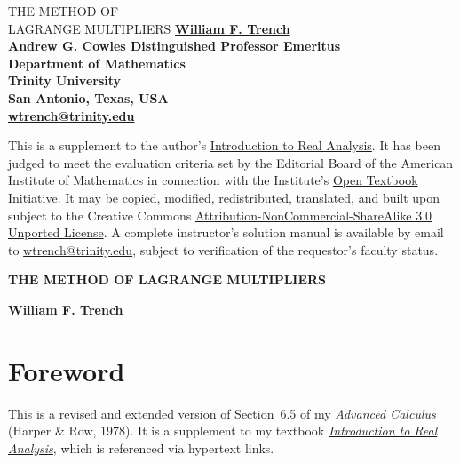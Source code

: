 \documentclass{article}
\begin{document}
\noindent

\thispagestyle{empty}
\bf
\begin{center}
{\Huge THE METHOD OF\\\vspace{.2in} LAGRANGE MULTIPLIERS}
\vspace{.5in}
\huge
\bigskip
\vspace{.75in}
\bf\huge
\href{http://ramanujan.math.trinity.edu/wtrench/index.shtml}
{William F. Trench}
\medskip
\\\large
Andrew G. Cowles Distinguished Professor Emeritus\\
Department of Mathematics\\
Trinity University \\
San Antonio, Texas, USA\\
\href{mailto:{wtrench@trinity.edu}}
{wtrench@trinity.edu}
\large
\vspace*{.75in}
\end{center}


\rm
\noindent

\noindent
This is a supplement to the author's
\href{http://ramanujan.math.trinity.edu/wtrench/texts/TRENCH_REAL_ANALYSIS.PDF}
{\large Introduction to Real Analysis}.
It   has been judged to meet the evaluation criteria set by the
Editorial  Board
of the American Institute of Mathematics in connection with the Institute's
\href{http://www.aimath.org/textbooks/}
{Open
Textbook Initiative}.
It may be copied, modified, redistributed, translated,  and
built upon  subject to the Creative
Commons
      \href{http://creativecommons.org/licenses/by-nc-sa/3.0/deed.en_G}
{Attribution-NonCommercial-ShareAlike 3.0 Unported License}.
A complete instructor's solution manual is available by email to
\href{mailto:wtrench@trinity.edu}
{wtrench@trinity.edu},
 subject to verification of the requestor's
faculty status.

\newpage

\centerline{\bf THE METHOD OF LAGRANGE MULTIPLIERS}
\medskip
\medskip

\centerline{\bf William F. Trench}
\medskip

\section{Foreword} \label{section:1}
This is a revised and extended version of Section~6.5 of my
\emph{Advanced Calculus}
(Harper \& Row, 1978).
It is a supplement to my textbook
\href{http://ramanujan.math.trinity.edu/wtrench/texts/TRENCH_REAL_ANALYSIS.PDF}
{\emph{Introduction to Real Analysis}}, which
is referenced via hypertext links.
\end{document}
